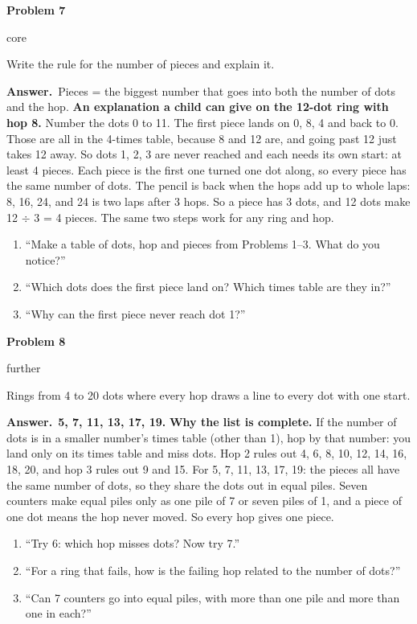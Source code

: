 \documentclass[11pt]{article}
\newcommand{\lbl}[1]{\colorbox{black!10}{\footnotesize\strut #1}}
\newcommand{\core}{\lbl{core}}
\newcommand{\further}{\lbl{further}}
\newcommand{\pb}[3]{\par\needspace{4\baselineskip}\vspace{3pt}\noindent\textbf{Problem #1}\enspace #2\enspace #3\par}
\newcommand{\ans}{\textbf{Answer.}\ }
\newenvironment{hints}{\begin{enumerate}[label={\textit{Hint \arabic*.}}, leftmargin=*, align=left]}{\end{enumerate}}
\begin{document}
\pb{7}{\core}{Write the rule for the number of pieces and explain it.}
\ans Pieces = the biggest number that goes into both the number of dots and the hop.
\textbf{An explanation a child can give on the 12-dot ring with hop 8.} Number the dots 0 to 11. The first piece
lands on 0, 8, 4 and back to 0. Those are all in the 4-times table, because 8 and 12 are, and going past 12 just
takes 12 away. So dots 1, 2, 3 are never reached and each needs its own start: at least 4 pieces. Each piece is
the first one turned one dot along, so every piece has the same number of dots. The pencil is back when the hops
add up to whole laps: 8, 16, 24, and 24 is two laps after 3 hops. So a piece has 3 dots, and 12 dots make
12 $\div$ 3 = 4 pieces. The same two steps work for any ring and hop.
\begin{hints}
\item ``Make a table of dots, hop and pieces from Problems 1--3. What do you notice?''
\item ``Which dots does the first piece land on? Which times table are they in?''
\item ``Why can the first piece never reach dot 1?''
\end{hints}

\pb{8}{\further}{Rings from 4 to 20 dots where every hop draws a line to every dot with one start.}
\ans \textbf{5, 7, 11, 13, 17, 19.}
\textbf{Why the list is complete.} If the number of dots is in a smaller number's times table (other than 1), hop
by that number: you land only on its times table and miss dots. Hop 2 rules out 4, 6, 8, 10, 12, 14, 16, 18, 20,
and hop 3 rules out 9 and 15. For 5, 7, 11, 13, 17, 19: the pieces all have the same number of dots, so they share
the dots out in equal piles. Seven counters make equal piles only as one pile of 7 or seven piles of 1, and a
piece of one dot means the hop never moved. So every hop gives one piece.
\begin{hints}
\item ``Try 6: which hop misses dots? Now try 7.''
\item ``For a ring that fails, how is the failing hop related to the number of dots?''
\item ``Can 7 counters go into equal piles, with more than one pile and more than one in each?''
\end{hints}
\end{document}
